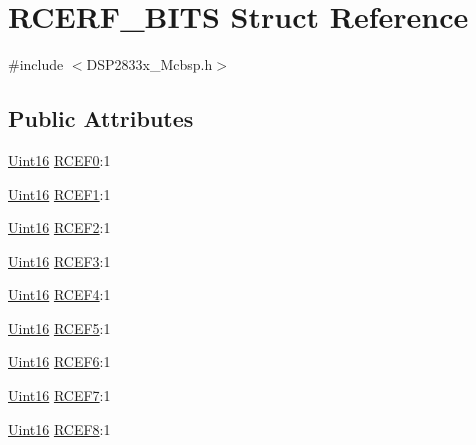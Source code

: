 \hypertarget{struct_r_c_e_r_f___b_i_t_s}{}\section{R\+C\+E\+R\+F\+\_\+\+B\+I\+T\+S Struct Reference}
\label{struct_r_c_e_r_f___b_i_t_s}


{\ttfamily \#include $<$D\+S\+P2833x\+\_\+\+Mcbsp.\+h$>$}

\subsection*{Public Attributes}
\begin{DoxyCompactItemize}
\item 
\hyperlink{_d_s_p2833x___device_8h_a59a9f6be4562c327cbfb4f7e8e18f08b}{Uint16} \hyperlink{struct_r_c_e_r_f___b_i_t_s_acc67a2372e717f6cf51aca88b687a3e7}{R\+C\+E\+F0}\+:1
\item 
\hyperlink{_d_s_p2833x___device_8h_a59a9f6be4562c327cbfb4f7e8e18f08b}{Uint16} \hyperlink{struct_r_c_e_r_f___b_i_t_s_ae24d7604f56945af0ecab3d46cc7fd08}{R\+C\+E\+F1}\+:1
\item 
\hyperlink{_d_s_p2833x___device_8h_a59a9f6be4562c327cbfb4f7e8e18f08b}{Uint16} \hyperlink{struct_r_c_e_r_f___b_i_t_s_a8ccf77beffa9fd241841bffb53d5c2e9}{R\+C\+E\+F2}\+:1
\item 
\hyperlink{_d_s_p2833x___device_8h_a59a9f6be4562c327cbfb4f7e8e18f08b}{Uint16} \hyperlink{struct_r_c_e_r_f___b_i_t_s_ae75383edac64f8436fbf1c5942a89ab9}{R\+C\+E\+F3}\+:1
\item 
\hyperlink{_d_s_p2833x___device_8h_a59a9f6be4562c327cbfb4f7e8e18f08b}{Uint16} \hyperlink{struct_r_c_e_r_f___b_i_t_s_af920db9f1c9ed46eb163fd643072d392}{R\+C\+E\+F4}\+:1
\item 
\hyperlink{_d_s_p2833x___device_8h_a59a9f6be4562c327cbfb4f7e8e18f08b}{Uint16} \hyperlink{struct_r_c_e_r_f___b_i_t_s_a99a5af8dc1d576d2b7f27c82d8af86b7}{R\+C\+E\+F5}\+:1
\item 
\hyperlink{_d_s_p2833x___device_8h_a59a9f6be4562c327cbfb4f7e8e18f08b}{Uint16} \hyperlink{struct_r_c_e_r_f___b_i_t_s_aefb238e8d9fb422dcdcdd83449d3c48e}{R\+C\+E\+F6}\+:1
\item 
\hyperlink{_d_s_p2833x___device_8h_a59a9f6be4562c327cbfb4f7e8e18f08b}{Uint16} \hyperlink{struct_r_c_e_r_f___b_i_t_s_a65ead94f0d2f805b2b3fe7549d3aa702}{R\+C\+E\+F7}\+:1
\item 
\hyperlink{_d_s_p2833x___device_8h_a59a9f6be4562c327cbfb4f7e8e18f08b}{Uint16} \hyperlink{struct_r_c_e_r_f___b_i_t_s_a071d541c71a2f82658540cad453ed877}{R\+C\+E\+F8}\+:1

\end{DoxyCompactItemize}

